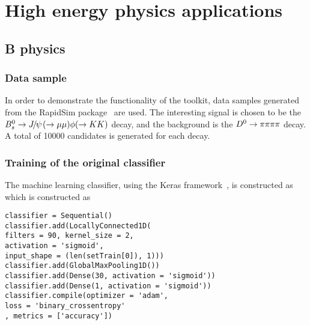 \section{High energy physics applications}
\label{sec:hep}

\subsection{B physics}

\subsubsection{Data sample}

In order to demonstrate the functionality of the toolkit, data samples generated
from the RapidSim package~\cite{rapid} are used. The interesting signal is chosen
to be the ${{B}^0_{s}}\rightarrow{\ensuremath{{J\mskip -3mu/\mskip -2mu\psi\mskip 2mu}}}(\rightarrow\mu\mu )\phi (\rightarrow KK )$ decay, and the background is
the ${{D}^0}\rightarrow\pi\pi\pi\pi$ decay. A total of 10000 candidates is generated for each decay.

\subsubsection{Training of the original classifier}
\label{sec:orig_training}

The machine learning classifier, using the Keras framework~\cite{keras},
is constructed as
which is constructed as
\begin{lstlisting}
classifier = Sequential()
classifier.add(LocallyConnected1D(
filters = 90, kernel_size = 2,
activation = 'sigmoid',
input_shape = (len(setTrain[0]), 1)))
classifier.add(GlobalMaxPooling1D())
classifier.add(Dense(30, activation = 'sigmoid'))
classifier.add(Dense(1, activation = 'sigmoid'))
classifier.compile(optimizer = 'adam',
loss = 'binary_crossentropy'
, metrics = ['accuracy'])
\end{lstlisting}

